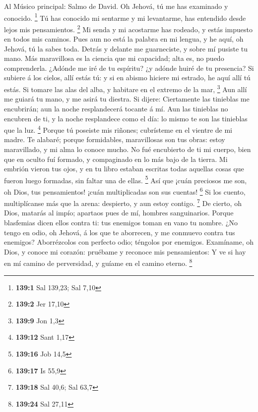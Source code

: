  Al Músico principal: Salmo de David. Oh Jehová, tú me has
examinado y conocido. \footnote{\textbf{139:1} Sal 139,23; Sal 7,10}
 Tú has conocido mi sentarme y mi levantarme, has entendido
desde lejos mis pensamientos. \footnote{\textbf{139:2} Jer 17,10}
 Mi senda y mi acostarme has rodeado, y estás impuesto en
todos mis caminos.  Pues aun no está la palabra en mi
lengua, y he aquí, oh Jehová, tú la sabes toda.  Detrás y
delante me guarneciste, y sobre mí pusiste tu mano.  Más
maravillosa es la ciencia que mi capacidad; alta es, no puedo
comprenderla.  ¿Adónde me iré de tu espíritu? ¿y adónde
huiré de tu presencia?  Si subiere á los cielos, allí estás
tú: y si en abismo hiciere mi estrado, he aquí allí tú estás.
 Si tomare las alas del alba, y habitare en el extremo de la
mar, \footnote{\textbf{139:9} Jon 1,3}  Aun allí me guiará
tu mano, y me asirá tu diestra.  Si dijere: Ciertamente las
tinieblas me encubrirán; aun la noche resplandecerá tocante á mí.
 Aun las tinieblas no encubren de ti, y la noche
resplandece como el día: lo mismo te son las tinieblas que la luz.
\footnote{\textbf{139:12} Sant 1,17}  Porque tú poseiste
mis riñones; cubrísteme en el vientre de mi madre.  Te
alabaré; porque formidables, maravillosas son tus obras: estoy
maravillado, y mi alma lo conoce mucho.  No fué encubierto
de ti mi cuerpo, bien que en oculto fuí formado, y compaginado en lo más
bajo de la tierra.  Mi embrión vieron tus ojos, y en tu
libro estaban escritas todas aquellas cosas que fueron luego formadas,
sin faltar una de ellas. \footnote{\textbf{139:16} Job 14,5}
 Así que ¡cuán preciosos me son, oh Dios, tus pensamientos!
¡cuán multiplicadas son sus cuentas! \footnote{\textbf{139:17} Is 55,9}
 Si los cuento, multiplícanse más que la arena: despierto,
y aun estoy contigo. \footnote{\textbf{139:18} Sal 40,6; Sal 63,7}
 De cierto, oh Dios, matarás al impío; apartaos pues de mí,
hombres sanguinarios.  Porque blasfemias dicen ellos contra
ti: tus enemigos toman en vano tu nombre.  ¿No tengo en
odio, oh Jehová, á los que te aborrecen, y me conmuevo contra tus
enemigos?  Aborrézcolos con perfecto odio; téngolos por
enemigos.  Examíname, oh Dios, y conoce mi corazón:
pruébame y reconoce mis pensamientos:  Y ve si hay en mí
camino de perversidad, y guíame en el camino eterno. \footnote{\textbf{139:24}
  Sal 27,11}


